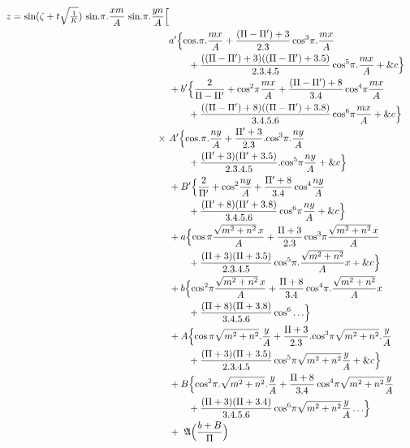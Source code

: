 \documentclass[11pt,a4paper]{article}
\begin{document}

\begin{align*}
z = \text{sin}(\zeta + t\sqrt{\tfrac{1}{K}})\ \text{sin}.\pi.\frac{xm}{A}\ \text{sin}.\pi.\frac{yn}{A}\Bigl[\\ &a'\Bigl\{\text{cos}.\pi.\frac{mx}{A} + \frac{(\Pi-\Pi')+3}{2.3}\,\text{cos}^3\pi.\frac{mx}{A}\\
&\qquad + \frac{((\Pi-\Pi')+3)((\Pi-\Pi')+3.5)}{2.3.4.5}\,\text{cos}^5\pi.\frac{mx}{A} + \&c\Bigr\}\\
&+ b'\Bigl\{\frac{2}{\Pi-\Pi'} + \text{cos}^2\pi\frac{mx}{A} + \frac{(\Pi-\Pi')+8}{3.4}\,\text{cos}^4\pi\frac{mx}{A}\\
&\qquad + \frac{((\Pi-\Pi')+8)((\Pi-\Pi')+3.8)}{3.4.5.6}\,\text{cos}^6\pi\frac{mx}{A} + \&c\Bigr\}\\
\times\ &A'\Bigl\{\text{cos}.\pi.\frac{ny}{A} + \frac{\Pi'+3}{2.3}.\text{cos}^3\pi.\frac{ny}{A}\\
&\qquad + \frac{(\Pi'+3)(\Pi'+3.5)}{2.3.4.5}.\text{cos}^5\pi\frac{ny}{A} + \&c\Bigr\}\\
&+ B'\Bigl\{\frac{2}{\Pi'} + \text{cos}^2\frac{ny}{A} + \frac{\Pi'+8}{3.4}\,\text{cos}^4\frac{ny}{A}\\
&\qquad + \frac{(\Pi'+8)(\Pi'+3.8)}{3.4.5.6}\,\text{cos}^6\pi\frac{ny}{A} + \&c\Bigr\}\\
&+a\Bigl\{\text{cos}\,\pi\frac{\sqrt{m^2+n^2}\,x}{A} + \frac{\Pi+3}{2.3}\,\text{cos}^3\pi\frac{\sqrt{m^2+n^2}\,x}{A}\\
&\qquad + \frac{(\Pi+3)(\Pi+3.5)}{2.3.4.5}\,\text{cos}^5\pi.\frac{\sqrt{m^2+n^2}}{A}x + \&c\Bigr\}\\
&+ b\Bigl\{\text{cos}^2\pi\frac{\sqrt{m^2+n^2}\,x}{A} + \frac{\Pi+8}{3.4}\,\text{cos}^4\pi.\frac{\sqrt{m^2+n^2}}{A}x\\
&\qquad + \frac{(\Pi+8)(\Pi+3.8)}{3.4.5.6}\,\text{cos}^6\ldots\Bigr\}\\
&+A\Bigl\{\text{cos}\,\pi\sqrt{m^2+n^2}.\frac{y}{A} + \frac{\Pi+3}{2.3}.\text{cos}^3\pi\sqrt{m^2+n^2}.\frac{y}{A}\\
&\qquad + \frac{(\Pi+3)(\Pi+3.5)}{2.3.4.5}\,\text{cos}^5\pi\sqrt{m^2+n^2}\frac{y}{A} + \&c\Bigr\}\\
&+ B\Bigl\{\text{cos}^2\pi.\sqrt{m^2+n^2}.\frac{y}{A} + \frac{\Pi+8}{3.4}\,\text{cos}^4\pi\sqrt{m^2+n^2}\frac{y}{A}\\
&\qquad + \frac{(\Pi+3)(\Pi+3.4)}{3.4.5.6}\,\text{cos}^6\pi\sqrt{m^2+n^2}\frac{y}{A}\ldots\Bigr\}\\
&+\ \mathfrak{A}\Bigl(\frac{b+B}{\Pi}\Bigr)
\end{align*}
\end{document}
